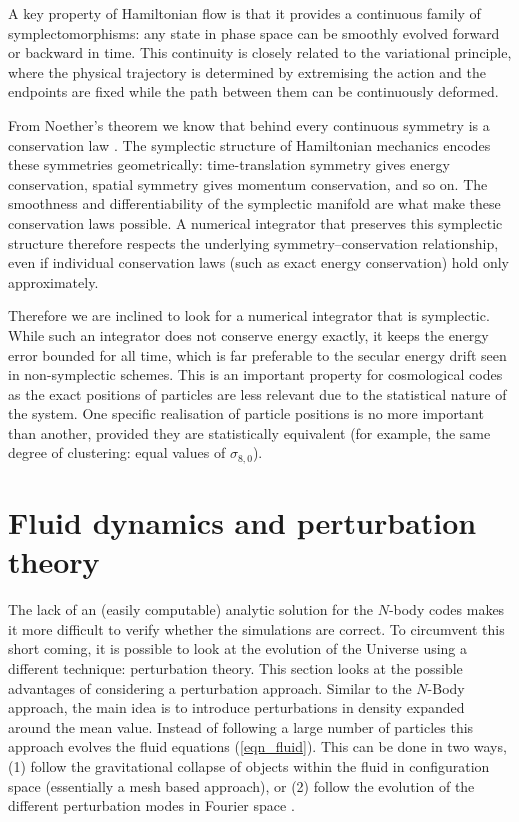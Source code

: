 A key property of Hamiltonian flow is that it provides a continuous family of symplectomorphisms: any state in phase space can be smoothly evolved forward or backward in time. This continuity is closely related to the variational principle, where the physical trajectory is determined by extremising the action and the endpoints are fixed while the path between them can be continuously deformed.

From Noether's theorem we know that behind every continuous symmetry is a conservation law \citep{bib_noe}. The symplectic structure of Hamiltonian mechanics encodes these symmetries geometrically: time-translation symmetry gives energy conservation, spatial symmetry gives momentum conservation, and so on. The smoothness and differentiability of the symplectic manifold are what make these conservation laws possible. A numerical integrator that preserves this symplectic structure therefore respects the underlying symmetry--conservation relationship, even if individual conservation laws (such as exact energy conservation) hold only approximately. \citep{bib_duff}

Therefore we are inclined to look for a numerical integrator that is symplectic. While such an integrator does not conserve energy exactly, it keeps the energy error bounded for all time, which is far preferable to the secular energy drift seen in non-symplectic schemes. This is an important property for cosmological codes as the exact positions of particles are less relevant due to the statistical nature of the system. One specific realisation of particle positions is no more important than another, provided they are statistically equivalent (for example, the same degree of clustering: equal values of $\sigma_{8,0}$).

\section{Fluid dynamics and perturbation theory}
\label{sec_pert}
The lack of an (easily computable) analytic solution for the $N$-body codes makes it more difficult to verify whether the simulations are correct. To circumvent this short coming, it is possible to look at the evolution of the Universe using a different technique: perturbation theory. This section looks at the possible advantages of considering a perturbation approach. Similar to the $N$-Body approach, the main idea is to introduce perturbations in density expanded around the mean value. Instead of following a large number of particles this approach evolves the fluid equations (\ref{eqn_fluid}). This can be done in two ways, (1) follow the gravitational collapse of objects within the fluid in configuration space (essentially a mesh based approach), or (2) follow the evolution of the different perturbation modes in Fourier space \citep{bib_mab, bib_huw, bib_cmb, bib_cmb2}.

